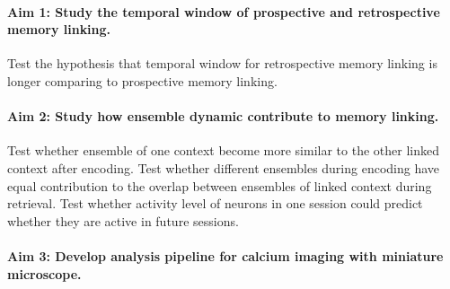 \documentclass[master.tex]{subfiles}
\begin{document}
\paragraph{Aim 1: Study the temporal window of prospective and retrospective
  memory linking.} Test the hypothesis that temporal window for retrospective
memory linking is longer comparing to prospective memory linking.

\paragraph{Aim 2: Study how ensemble dynamic contribute to memory linking.} Test
whether ensemble of one context become more similar to the other linked context
after encoding. Test whether different ensembles during encoding have equal
contribution to the overlap between ensembles of linked context during
retrieval. Test whether activity level of neurons in one session could predict
whether they are active in future sessions.

\paragraph{Aim 3: Develop analysis pipeline for calcium imaging with miniature
  microscope.}

\newpage
\end{document}
